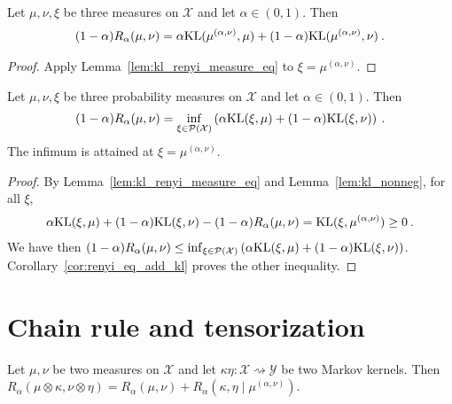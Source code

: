 \begin{corollary}
  \label{cor:renyi_eq_add_kl}
  Let $\mu, \nu, \xi$ be three measures on $\mathcal X$ and let $\alpha \in (0, 1)$. Then
  \begin{align*}
  (1 - \alpha) R_\alpha(\mu, \nu) = \alpha \mathrm{KL}(\mu^{(\alpha, \nu)}, \mu) + (1 - \alpha)\mathrm{KL}(\mu^{(\alpha, \nu)}, \nu) \: .
  \end{align*}
\end{corollary}

\begin{proof}
Apply Lemma~\ref{lem:kl_renyi_measure_eq} to $\xi = \mu^{(\alpha, \nu)}$.
\end{proof}

\begin{lemma}
  \label{lem:renyi_eq_inf_add_kl}
  Let $\mu, \nu, \xi$ be three probability measures on $\mathcal X$ and let $\alpha \in (0, 1)$. Then
  \begin{align*}
  (1 - \alpha) R_\alpha(\mu, \nu) = \inf_{\xi \in \mathcal P(\mathcal X)}\left( \alpha \mathrm{KL}(\xi, \mu) + (1 - \alpha)\mathrm{KL}(\xi, \nu) \right) \: .
  \end{align*}
  The infimum is attained at $\xi = \mu^{(\alpha, \nu)}$.
\end{lemma}

\begin{proof}
By Lemma~\ref{lem:kl_renyi_measure_eq} and Lemma~\ref{lem:kl_nonneg}, for all $\xi$,
\begin{align*}
\alpha \mathrm{KL}(\xi, \mu) + (1 - \alpha)\mathrm{KL}(\xi, \nu) - (1 - \alpha) R_\alpha(\mu, \nu)
= \mathrm{KL}(\xi, \mu^{(\alpha, \nu)})
\ge 0 \: .
\end{align*}
We have then $(1 - \alpha) R_\alpha(\mu, \nu) \le \inf_{\xi \in \mathcal P(\mathcal X)}\left( \alpha \mathrm{KL}(\xi, \mu) + (1 - \alpha)\mathrm{KL}(\xi, \nu) \right)$.
Corollary~\ref{cor:renyi_eq_add_kl} proves the other inequality.
\end{proof}

\section{Chain rule and tensorization}

\begin{theorem}
  \label{thm:renyi_chain_rule}
  Let $\mu, \nu$ be two measures on $\mathcal X$ and let $\kappa \eta : \mathcal X \rightsquigarrow \mathcal Y$ be two Markov kernels.
  Then $R_\alpha(\mu \otimes \kappa, \nu \otimes \eta) = R_\alpha(\mu, \nu) + R_\alpha(\kappa, \eta \mid \mu^{(\alpha, \nu)})$.
\end{theorem}

